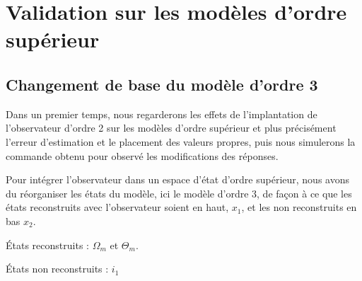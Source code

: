 \section{Validation sur les modèles d'ordre supérieur}
\subsection{Changement de base du modèle d'ordre 3}
Dans un premier temps, nous regarderons les effets de l'implantation de l'observateur d'ordre 2 sur les modèles d'ordre supérieur et plus précisément l'erreur d'estimation et le placement des valeurs propres, puis nous simulerons la commande obtenu pour observé les modifications des réponses.

Pour intégrer l'observateur dans un espace d'état d'ordre supérieur, nous avons du réorganiser les états du modèle, ici le modèle d'ordre 3, de façon à ce que les états reconstruits avec l'observateur soient en haut, $x_1$, et les non reconstruits en bas $x_2$.

\noindent\textbullet\hspace{2mm} États reconstruits : $\Omega_m$ et $ \Theta_m$.

\noindent\textbullet\hspace{2mm} États non reconstruits : $i_1$

